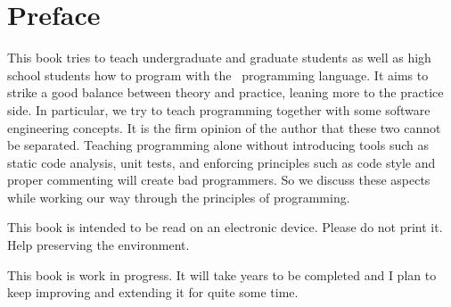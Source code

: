 \chapter*{Preface}%
%
%
This book tries to teach undergraduate and graduate students as well as high school students how to program with the \python\ programming language.
It aims to strike a good balance between theory and practice, leaning more to the practice side.
In particular, we try to teach programming together with some software engineering concepts.
It is the firm opinion of the author that these two cannot be separated.
Teaching programming alone without introducing tools such as static code analysis, unit tests, and enforcing principles such as code style and proper commenting will create bad programmers.
So we discuss these aspects while working our way through the principles of programming.

This book is intended to be read on an electronic device.
Please do not print it.
Help preserving the environment.

This book is work in progress.
It will take years to be completed and I plan to keep improving and extending it for quite some time.

